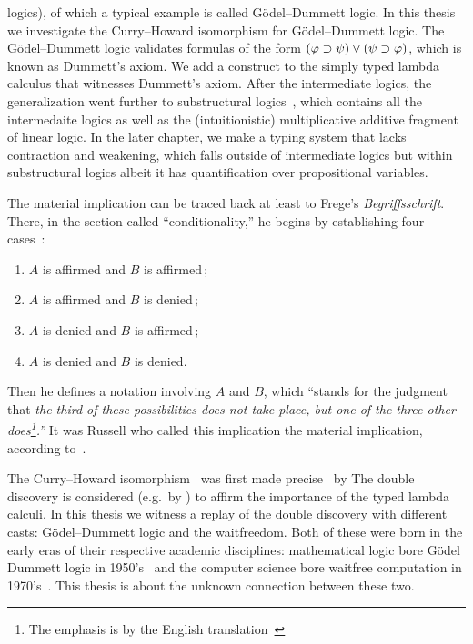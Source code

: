 logics), of which a typical example is called G\"odel--Dummett logic.
In this thesis we investigate the Curry--Howard isomorphism for
G\"odel--Dummett logic.  The G\"odel--Dummett logic validates formulas
of the form $(\varphi\supset\psi)\lor(\psi\supset\varphi)$, which is known as
Dummett's axiom.  We add a construct to the simply typed lambda calculus
that witnesses Dummett's axiom.
After the intermediate logics, the generalization went further to
substructural
logics~, which contains all the intermedaite logics as
well as the
(intuitionistic) multiplicative
additive fragment of linear logic.
In the later chapter, we make a typing system that lacks contraction and
weakening, which falls outside of intermediate logics but within
substructural logics albeit it has quantification over propositional variables.

The material implication can be traced back at least to
Frege's \textit{Begriffsschrift}.  There, in the section called
``conditionality,''
he begins by establishing four cases~\citep[p.~13]{van1967frege}:
\begin{enumerate}
 \item $A$ is affirmed and $B$ is affirmed\,;
 \item $A$ is affirmed and $B$ is denied\,;
 \item $A$ is denied and $B$ is affirmed\,;
 \item $A$ is denied and $B$ is denied.
\end{enumerate}
Then he defines a notation involving $A$ and $B$, which ``stands for the
judgment that \textit{the third of these possibilities does not take
place, but one of the three other does\footnote{The emphasis is by
the English translation~\citep[p.~14]{van1967frege}}.''}
It was Russell who called this implication the material implication,
according to~\citet{sep-conditionals}.

The Curry--Howard isomorphism~\citep{curryhoward} was first made
precise~\citep[p.97]{curryhoward} by \citet[\textbf{9}E and \textbf{9}F]{curry1974combinatory}
The double discovery is considered (e.g.~by \citet{wadler2012propositions})
to affirm the importance of the typed lambda calculi.
In this thesis we witness a replay of the double discovery with
different casts: G\"odel--Dummett logic and the waitfreedom.
Both of these were born in the early eras of their respective academic
disciplines:
mathematical logic bore G\"odel Dummett logic in
1950's~\citep{dummett59}
and the
computer science bore waitfree computation in
1970's~\citep{lamport1979make}.
This thesis is about the unknown connection between these two.

